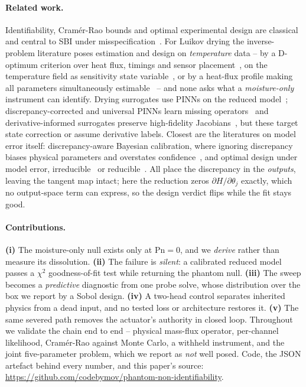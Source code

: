 \documentclass{article}
\begin{document}
\paragraph{Related work.} Identifiability, Cram\'er-Rao bounds and optimal experimental design are
classical~\cite{kay1993,pukelsheim2006} and central to SBI under misspecification~\cite{cranmer2020sbi}.
For Luikov drying the inverse-problem literature poses estimation and design on \emph{temperature}
data -- by a D-optimum criterion over heat flux, timings and sensor placement~\cite{dantas2002}, on
the temperature field as sensitivity state variable~\cite{lugon2003}, or by a heat-flux profile making
all parameters simultaneously estimable~\cite{bensefia2011} -- and none asks what a
\emph{moisture-only} instrument can identify. Drying surrogates use PINNs on the reduced
model~\cite{raissi2019,manavi2024,laubscher2021}; discrepancy-corrected and universal PINNs learn
missing operators~\cite{zou2024misspecification,podina2023upinn} and derivative-informed surrogates
preserve high-fidelity Jacobians~\cite{olearyroseberry2024dino}, but these target state correction or
assume derivative labels. Closest are the literatures on model error itself: discrepancy-aware
Bayesian calibration, where ignoring discrepancy biases physical parameters and overstates
confidence~\cite{kennedy2001calibration,brynjarsdottir2014discrepancy}, and optimal design under
model error, irreducible~\cite{koval2020oed} or reducible~\cite{alexanderian2021oed}. All place the
discrepancy in the \emph{outputs}, leaving the tangent map intact; here the reduction zeros
$\partial H/\partial\theta_j$ exactly, which no output-space term can express, so the design verdict
flips while the fit stays good.

\paragraph{Contributions.} \textbf{(i)} The moisture-only null exists only at $\mathrm{Pn}{=}0$, and
we \emph{derive} rather than measure its dissolution. \textbf{(ii)} The failure is \emph{silent}: a
calibrated reduced model passes a $\chi^2$ goodness-of-fit test while returning the phantom null.
\textbf{(iii)} The sweep becomes a \emph{predictive} diagnostic from one probe solve, whose
distribution over the box we report by a Sobol design. \textbf{(iv)} A two-head control separates
inherited physics from a dead input, and no tested loss or architecture restores it. \textbf{(v)} The
same severed path removes the actuator's authority in closed loop. Throughout we validate the chain
end to end -- physical mass-flux operator, per-channel likelihood, Cram\'er-Rao against Monte Carlo, a
withheld instrument, and the joint five-parameter problem, which we report as \emph{not} well posed.
Code, the JSON artefact behind every number, and this paper's source:
\url{https://github.com/codebymov/phantom-non-identifiability}.
\end{document}
